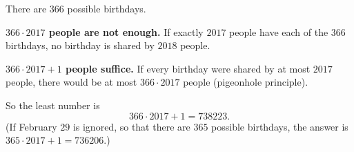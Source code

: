 There are $366$ possible birthdays.

\textbf{$366\cdot2017$ people are not enough.} If exactly $2017$ people have each of the $366$ birthdays, no birthday is shared by $2018$ people.

\textbf{$366\cdot2017+1$ people suffice.} If every birthday were shared by at most $2017$ people, there would be at most $366\cdot2017$ people (pigeonhole principle).

So the least number is
\[
366\cdot2017+1=\boxed{738223}.
\]
(If February $29$ is ignored, so that there are $365$ possible birthdays, the answer is $365\cdot2017+1=736206$.)
